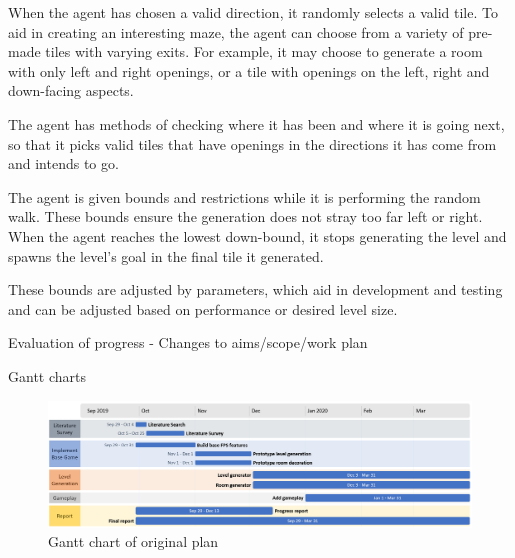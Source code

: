 \documentclass[progress]{cmpreport}
\begin{document}
When the agent has chosen a valid direction, it randomly selects a valid tile. To aid in creating an interesting maze, the agent can choose from a variety of pre-made tiles with varying exits. For example, it may choose to generate a room with only left and right openings, or a tile with openings on the left, right and down-facing aspects. 

The agent has methods of checking where it has been and where it is going next, so that it picks valid tiles that have openings in the directions it has come from and intends to go.

The agent is given bounds and restrictions while it is performing the random walk. These bounds ensure the generation does not stray too far left or right. When the agent reaches the lowest down-bound, it stops generating the level and spawns the level's goal in the final tile it generated.

These bounds are adjusted by parameters, which aid in development and testing and can be adjusted based on performance or desired level size.



\begin{section}{Evaluation of progress}
- Changes to aims/scope/work plan
\end{section}








\newpage

\appendix

\begin{section}{Gantt charts}

\begin{figure}
    \includegraphics[width=\textwidth,height=0.9\textheight,keepaspectratio]{img/gantt-original.png}
    \caption{Gantt chart of original plan}
    \label{fig:gantt1}
\end{figure}

\end{section}
\end{document}
